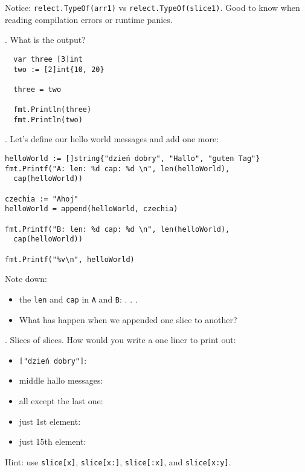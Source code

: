 \documentclass[11pt, letterpaper]{article}
\begin{document}
Notice: \texttt{relect.TypeOf(arr1)} vs \texttt{relect.TypeOf(slice1)}. Good to know when reading compilation errors or runtime panics.

. What is the output?

\begin{verbatim}
  var three [3]int
  two := [2]int{10, 20}

  three = two

  fmt.Println(three)
  fmt.Println(two)
\end{verbatim}

. Let's define our hello world messages and add one more:

\begin{verbatim}
helloWorld := []string{"dzień dobry", "Hallo", "guten Tag"}
fmt.Printf("A: len: %d cap: %d \n", len(helloWorld),
  cap(helloWorld))

czechia := "Ahoj"
helloWorld = append(helloWorld, czechia)

fmt.Printf("B: len: %d cap: %d \n", len(helloWorld),
  cap(helloWorld))

fmt.Printf("%v\n", helloWorld)
\end{verbatim}

\bigskip
Note down:
\begin{itemize}
    \item the \verb|len| and \verb|cap| in \verb|A| and \verb|B|: . . .
    \item What has happen when we appended one slice to another?
\end{itemize}

. Slices of slices. How would you write a one liner to print out:

\begin{itemize}
  \item \texttt{["dzień dobry"]}: \bigskip
  \item middle hallo messages: \bigskip
  \item all except the last one: \bigskip
  \item just 1st element: \bigskip
  \item just 15th element: \bigskip
\end{itemize}

Hint: use \texttt{slice[x]}, \texttt{slice[x:]}, \texttt{slice[:x]}, and \texttt{slice[x:y]}.
\end{document}

